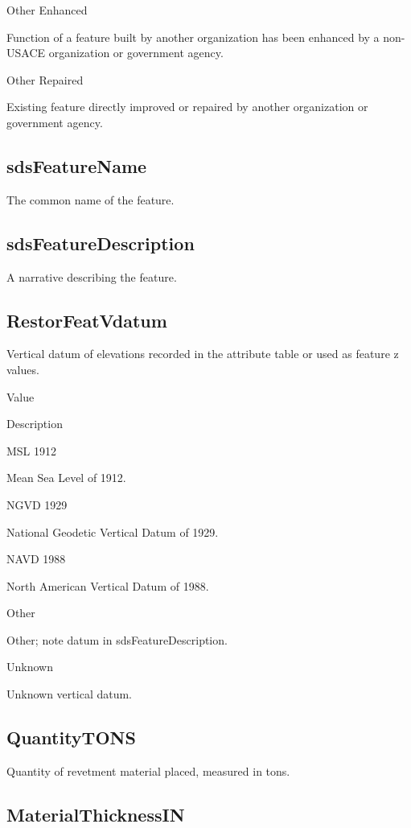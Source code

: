 \documentclass[
  letterpaper,
  DIV=11,
  numbers=noendperiod]{scrreprt}
\begin{document}
Other Enhanced

Function of a feature built by another organization has been enhanced by
a non-USACE organization or government agency.

Other Repaired

Existing feature directly improved or repaired by another organization
or government agency.

\subsection{sdsFeatureName}\label{sdsfeaturename-11}

The common name of the feature.

\subsection{sdsFeatureDescription}\label{sdsfeaturedescription-11}

A narrative describing the feature.

\subsection{RestorFeatVdatum}\label{restorfeatvdatum-11}

Vertical datum of elevations recorded in the attribute table or used as
feature z values.

Value

Description

MSL 1912

Mean Sea Level of 1912.

NGVD 1929

National Geodetic Vertical Datum of 1929.

NAVD 1988

North American Vertical Datum of 1988.

Other

Other; note datum in sdsFeatureDescription.

Unknown

Unknown vertical datum.

\subsection{QuantityTONS}\label{quantitytons}

Quantity of revetment material placed, measured in tons.

\subsection{MaterialThicknessIN}\label{materialthicknessin}
\end{document}
